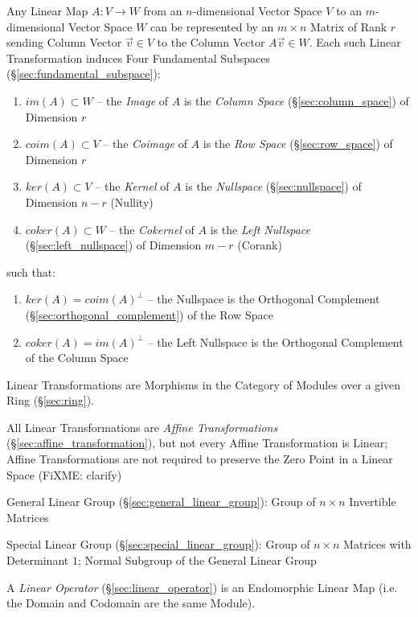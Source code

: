 Any Linear Map $A : V \rightarrow W$ from an $n$-dimensional Vector Space $V$
to an $m$-dimensional Vector Space $W$ can be represented by an $m \times n$
Matrix of Rank $r$ sending Column Vector $\vec{v} \in V$ to the Column Vector
$A\vec{v} \in W$. Each such Linear Transformation induces Four Fundamental
Subspaces (\S\ref{sec:fundamental_subspace}):
\begin{enumerate}
  \item $im(A) \subset W$ -- the \emph{Image} of $A$ is the \emph{Column Space}
    (\S\ref{sec:column_space}) of Dimension $r$
  \item $coim(A) \subset V$ -- the \emph{Coimage} of $A$ is the \emph{Row Space}
    (\S\ref{sec:row_space}) of Dimension $r$
  \item $ker(A) \subset V$ -- the \emph{Kernel} of $A$ is the \emph{Nullspace}
    (\S\ref{sec:nullspace}) of Dimension $n - r$ (Nullity) %
  \item $coker(A) \subset W$ -- the \emph{Cokernel} of $A$ is the \emph{Left
    Nullspace} (\S\ref{sec:left_nullspace}) of Dimension $m - r$ (Corank)
\end{enumerate}
such that:
\begin{enumerate}
  \item $ker(A) = coim(A)^\bot$ -- the Nullspace is the Orthogonal Complement
    (\S\ref{sec:orthogonal_complement}) of the Row Space
  \item $coker(A) = im(A)^\bot$ -- the Left Nullspace is the Orthogonal
    Complement of the Column Space
\end{enumerate}

Linear Transformations are Morphisms in the Category of Modules over a given
Ring (\S\ref{sec:ring}).

All Linear Transformations are \emph{Affine Transformations}
(\S\ref{sec:affine_transformation}), but not every Affine Transformation is
Linear; Affine Transformations are not required to preserve the Zero Point in a
Linear Space (FiXME: clarify)

\fist General Linear Group (\S\ref{sec:general_linear_group}): Group of $n
\times n$ Invertible Matrices

\fist Special Linear Group (\S\ref{sec:special_linear_group}): Group of $n
\times n$ Matrices with Determinant $1$; Normal Subgroup of the General Linear
Group

A \emph{Linear Operator} (\S\ref{sec:linear_operator}) is an Endomorphic Linear
Map (i.e. the Domain and Codomain are the same Module).

